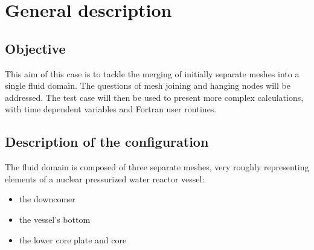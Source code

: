 
%
%
%
%


\section{General description}

        \subsection{Objective}

This aim of this case is to tackle the merging of initially separate meshes into
a single fluid domain. The questions of mesh joining and hanging nodes will be
addressed. The test case will then be used to present more complex calculations,
with time dependent variables and Fortran user routines.


        \subsection{Description of the configuration}

The fluid domain is composed of three separate meshes, very roughly representing
elements of a nuclear pressurized water reactor vessel:
\begin{itemize}
        \item the downcomer
        \item the vessel's bottom
        \item the lower core plate and core
\end{itemize}

